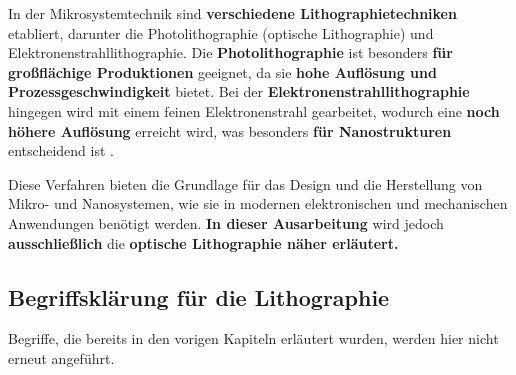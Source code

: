 \documentclass{article} %
\begin{document}
\vspace{1em}

In der Mikrosystemtechnik sind \textbf{verschiedene Lithographietechniken} etabliert, darunter die Photolithographie (optische Lithographie) und Elektronenstrahllithographie. Die \textbf{Photolithographie} ist besonders \textbf{für großflächige Produktionen} geeignet, da sie \textbf{hohe Auflösung und Prozessgeschwindigkeit} bietet. Bei der \textbf{Elektronenstrahllithographie} hingegen wird mit einem feinen Elektronenstrahl gearbeitet, wodurch eine \textbf{noch höhere Auflösung} erreicht wird, was besonders \textbf{für Nanostrukturen} entscheidend ist \cite{wolf2000}.

\vspace{1em}

Diese Verfahren bieten die Grundlage für das Design und die Herstellung von Mikro- und Nanosystemen, wie sie in modernen elektronischen und mechanischen Anwendungen benötigt werden. \textbf{In dieser Ausarbeitung} wird jedoch \textbf{ausschließlich} die \textbf{optische Lithographie näher erläutert.}





\vspace{1em}

\subsection{Begriffsklärung für die Lithographie}

Begriffe, die bereits in den vorigen Kapiteln erläutert wurden, werden hier nicht erneut angeführt.
\end{document}
